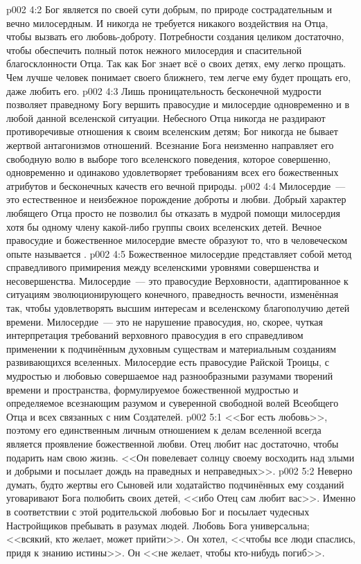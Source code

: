 \vs p002 4:2 Бог является по своей сути добрым, по природе сострадательным и вечно милосердным. И никогда не требуется никакого воздействия на Отца, чтобы вызвать его любовь\hyp{}доброту. Потребности создания целиком достаточно, чтобы обеспечить полный поток нежного милосердия и спасительной благосклонности Отца. Так как Бог знает всё о своих детях, ему легко прощать. Чем лучше человек понимает своего ближнего, тем легче ему будет прощать его, даже любить его.
\vs p002 4:3 \pc Лишь проницательность бесконечной мудрости позволяет праведному Богу вершить правосудие и милосердие одновременно и в любой данной вселенской ситуации. Небесного Отца никогда не раздирают противоречивые отношения к своим вселенским детям; Бог никогда не бывает жертвой антагонизмов отношений. Всезнание Бога неизменно направляет его свободную волю в выборе того вселенского поведения, которое совершенно, одновременно и одинаково удовлетворяет требованиям всех его божественных атрибутов и бесконечных качеств его вечной природы.
\vs p002 4:4 Милосердие~--- это естественное и неизбежное порождение доброты и любви. Добрый характер любящего Отца просто не позволил бы отказать в мудрой помощи милосердия хотя бы одному члену какой\hyp{}либо группы своих вселенских детей. Вечное правосудие и божественное милосердие вместе образуют то, что в человеческом опыте называется .
\vs p002 4:5 Божественное милосердие представляет собой метод справедливого примирения между вселенскими уровнями совершенства и несовершенства. Милосердие~--- это правосудие Верховности, адаптированное к ситуациям эволюционирующего конечного, праведность вечности, изменённая так, чтобы удовлетворять высшим интересам и вселенскому благополучию детей времени. Милосердие~--- это не нарушение правосудия, но, скорее, чуткая интерпретация требований верховного правосудия в его справедливом применении к подчинённым духовным существам и материальным созданиям развивающихся вселенных. Милосердие есть правосудие Райской Троицы, с мудростью и любовью совершаемое над разнообразными разумами творений времени и пространства, формулируемое божественной мудростью и определяемое всезнающим разумом и суверенной свободной волей Всеобщего Отца и всех связанных с ним Создателей.
\vs p002 5:1 <<Бог есть любовь>>, поэтому его единственным личным отношением к делам вселенной всегда является проявление божественной любви. Отец любит нас достаточно, чтобы подарить нам свою жизнь. <<Он повелевает солнцу своему восходить над злыми и добрыми и посылает дождь на праведных и неправедных>>.
\vs p002 5:2 \pc Неверно думать, будто жертвы его Сыновей или ходатайство подчинённых ему созданий уговаривают Бога полюбить своих детей, <<ибо Отец сам любит вас>>. Именно в соответствии с этой родительской любовью Бог и посылает чудесных Настройщиков пребывать в разумах людей. Любовь Бога универсальна; <<всякий, кто желает, может прийти>>. Он хотел, <<чтобы все люди спаслись, придя к знанию истины>>. Он <<не желает, чтобы кто\hyp{}нибудь погиб>>.

